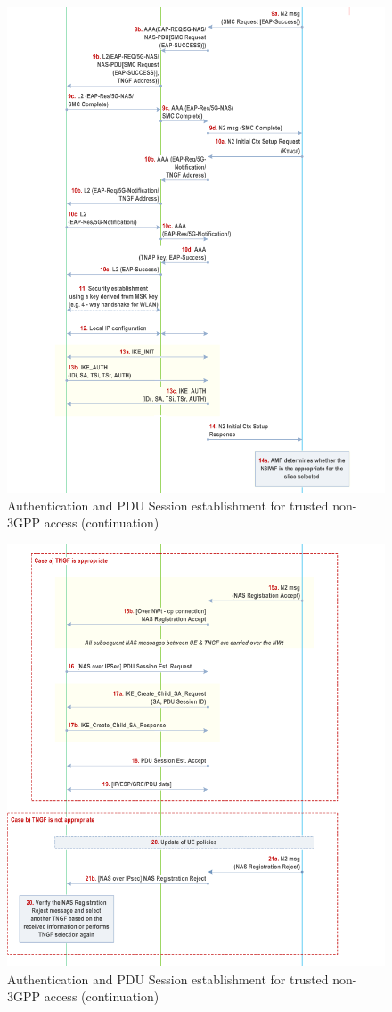 \begin{figure}
    \centering
    \includegraphics[width=0.75\linewidth]{figs/Authentication and PDU Session establishment for trusted non-3GPP access_2.png}
    \caption{Authentication and \ac{PDU} Session establishment for trusted non-\ac{3GPP} access (continuation)}
    \label{fig:Authentication and PDU Session establishment for trusted non-3GPP access_2}
\end{figure}

\begin{figure}
    \centering
    \includegraphics[width=0.75\linewidth]{figs/Authentication and PDU Session establishment for trusted non-3GPP access_3.png}
    \caption{Authentication and \ac{PDU} Session establishment for trusted non-\ac{3GPP} access (continuation)}
    \label{fig:Authentication and PDU Session establishment for trusted non-3GPP access_3}
\end{figure}

